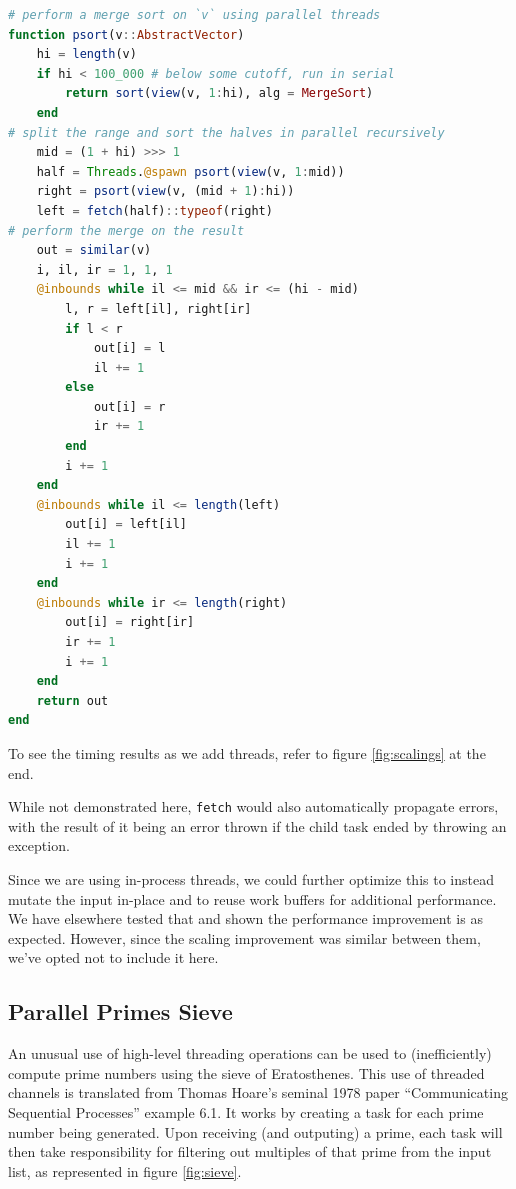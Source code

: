 \documentclass{juliacon}
\begin{document}
\begin{lstlisting}[language = Julia]
# perform a merge sort on `v` using parallel threads
function psort(v::AbstractVector)
    hi = length(v)
    if hi < 100_000 # below some cutoff, run in serial
        return sort(view(v, 1:hi), alg = MergeSort)
    end
# split the range and sort the halves in parallel recursively
    mid = (1 + hi) >>> 1
    half = Threads.@spawn psort(view(v, 1:mid))
    right = psort(view(v, (mid + 1):hi))
    left = fetch(half)::typeof(right)
# perform the merge on the result
    out = similar(v)
    i, il, ir = 1, 1, 1
    @inbounds while il <= mid && ir <= (hi - mid)
        l, r = left[il], right[ir]
        if l < r
            out[i] = l
            il += 1
        else
            out[i] = r
            ir += 1
        end
        i += 1
    end
    @inbounds while il <= length(left)
        out[i] = left[il]
        il += 1
        i += 1
    end
    @inbounds while ir <= length(right)
        out[i] = right[ir]
        ir += 1
        i += 1
    end
    return out
end
\end{lstlisting}

To see the timing results as we add threads, refer to figure \ref{fig:scalings} at the end.

While not demonstrated here, \verb|fetch| would also automatically propagate errors, with the result of it being an error thrown if the child task ended by throwing an exception.

Since we are using in-process threads, we could further optimize this to instead mutate the input in-place and to reuse work buffers for additional performance. We have elsewhere tested that and shown the performance improvement is as expected. However, since the scaling improvement was similar between them, we've opted not to include it here.

\subsection{Parallel Primes Sieve}
\label{subsub:pprimes}

An unusual use of high-level threading operations can be used to (inefficiently) compute prime numbers using the sieve of Eratosthenes.
This use of threaded channels is translated from Thomas Hoare's seminal 1978 paper ``Communicating Sequential Processes''\cite{Hoare:1978:CSP:359576.359585} example 6.1. It works by creating a task for each prime number being generated. Upon receiving (and outputing) a prime, each task will then take responsibility for filtering out multiples of that prime from the input list, as represented in figure \ref{fig:sieve}.
\end{document}
